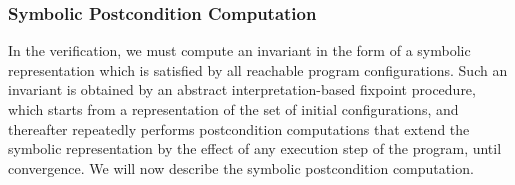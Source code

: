 \subsubsection{Symbolic Postcondition Computation}
\label{subsect:postcond}
In the  verification, we must compute an invariant in the form
of a symbolic representation
which is satisfied by all reachable program configurations.
Such an invariant is obtained by an abstract interpretation-based
fixpoint procedure, which starts
from a representation of the set of initial configurations, and
thereafter repeatedly performs postcondition computations that extend the
symbolic representation by the effect of any execution step of the program,
until convergence.
We will now describe the symbolic postcondition computation.

  


